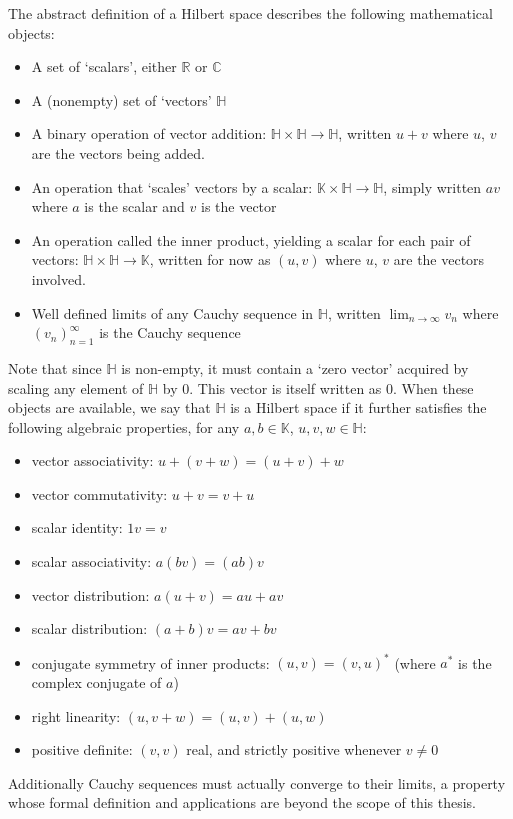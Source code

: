 The abstract definition of a Hilbert space describes the following mathematical objects:
\begin{itemize}
	\item A set of `scalars', either $\mathbb{R}$ or $\mathbb{C}$
	\item A (nonempty) set of `vectors' $\mathbb{H}$
	\item A binary operation of vector addition: $\mathbb{H} \times \mathbb{H} \to \mathbb{H}$, written $u + v$ where $u$, $v$ are the vectors being added.
	\item An operation that `scales' vectors by a scalar: $\mathbb{K} \times \mathbb{H} \to \mathbb{H}$, simply written $av$ where $a$ is the scalar and $v$ is the vector
	\item An operation called the inner product, yielding a scalar for each pair of vectors: $\mathbb{H} \times \mathbb{H} \to \mathbb{K}$, written for now as $(u, v)$ where $u$, $v$ are the vectors involved.
	\item Well defined limits of any Cauchy sequence in $\mathbb{H}$, written $\lim_{n \to \infty} v_n$ where $(v_n)_{n=1}^\infty$ is the Cauchy sequence
\end{itemize}
Note that since $\mathbb{H}$ is non-empty, it must contain a `zero vector' acquired by scaling any element of $\mathbb{H}$ by 0. This vector is itself written as 0. When these objects are available, we say that $\mathbb{H}$ is a Hilbert space if it further satisfies the following algebraic properties, for any $a, b\in \mathbb{K}$, $u,v,w \in \mathbb{H}$:
\begin{itemize}
	\item vector associativity: $u + (v + w) = (u + v) + w$
	\item vector commutativity: $u + v = v + u$
	\item scalar identity: $1v = v$
	\item scalar associativity: $a(bv) = (ab)v$
	\item vector distribution: $a(u + v) = au + av$
	\item scalar distribution: $(a+b)v = av + bv$
	\item conjugate symmetry of inner products: $(u, v) = (v, u)^*$ (where $a^*$ is the complex conjugate of $a$)
	\item right linearity: $(u, v+w) = (u, v) + (u, w)$
	\item positive definite: $(v, v)$ real, and strictly positive whenever $v \neq 0$
\end{itemize}
Additionally Cauchy sequences must actually converge to their limits, a property whose formal definition and applications are beyond the scope of this thesis.

